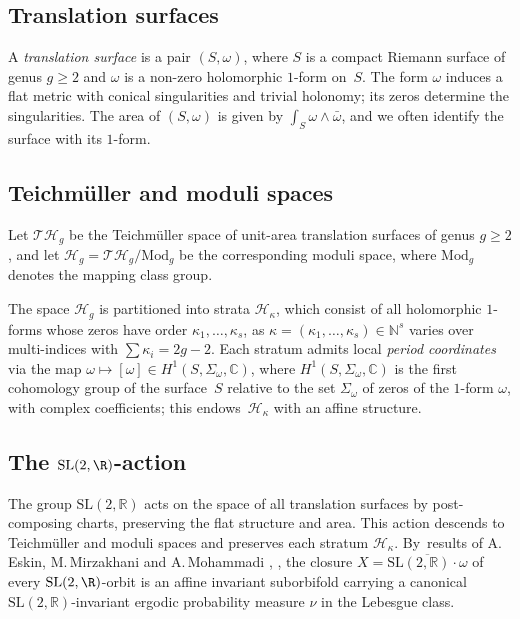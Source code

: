 \documentclass[JEP,XML,SOM,Unicode,published]{cedram}
\theoremstyle{plain}
\theoremstyle{definition}
\numberwithin{equation}{subsection}
\newcommand\cH{\mathcal{H}}
\newcommand\cT{\mathcal{T}}
\newcommand{\Mod}{\mathrm{Mod}}
\newcommand{\SL}{\mathrm{SL}}
\newcommand{\Tm}{Teichmüller\xspace}
\begin{document}
\subsection{Translation surfaces} A \emph{translation surface} is a pair $(S, \omega)$, where $S$ is a compact Riemann surface of genus $g \geq 2$ and $\omega$ is a non-zero holomorphic $1$-form on~$S$. The form $\omega$ induces a flat metric with conical singularities and trivial holonomy; its zeros determine the singularities. The area of $(S,\omega)$ is given by $\int_S \omega \wedge \bar{\omega}$, and we often identify the surface with its $1$-form.

\subsection{Teichmüller and moduli spaces} Let $ \cT\cH_g$ be the \Tm space of unit-area translation surfaces of genus $g \geq 2$, and let $ \cH_g = \cT\cH_g / \Mod_g$ be the corresponding moduli space, where $\Mod_g$ denotes the mapping class group.

The space $\cH_g$ is partitioned into strata $\cH_{\kappa}$, which consist of all holomorphic $1$\nobreakdash-forms whose zeros have order $\kappa_1, \dots, \kappa_s$, as $\kappa=(\kappa_1, \dots, \kappa_s) \in \mathbb N^s$ varies over multi-indices with $\sum \kappa_i = 2g-2$. Each stratum admits local \emph{period coordinates} via the map $\omega \mapsto [\omega] \in H^1(S, \Sigma_\omega, \mathbb{C})$, where $H^1(S, \Sigma_\omega, \mathbb{C})$ is the first cohomology group of the surface~$S$ relative to the set $\Sigma_\omega$ of zeros of the $1$-form $\omega$, with complex coefficients; this endows~$\cH_\kappa$ with an affine structure.

\subsection{The $\SL(2,\R)$-action} The group $\SL(2,\mathbb{R})$ acts on the space of all translation surfaces by post-composing charts, preserving the flat structure and area. This action descends to Teichmüller and moduli spaces
and preserves each stratum $\cH_\kappa$. By~results of A.\,Eskin, M.\,Mirzakhani and A.\,Mohammadi \cite{EMM15}, \cite{EM18}, the closure $X = \overline{\SL(2,\mathbb{R}) \cdot \omega}$ of every $\SL(2, \R)$-orbit is an affine invariant suborbifold carrying a canonical $\SL(2,\mathbb{R})$-invariant ergodic probability measure $\nu$ in the Lebesgue class.
\end{document}
